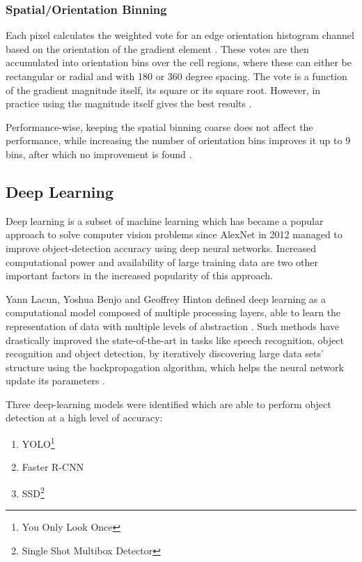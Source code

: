 \subsubsection{Spatial/Orientation Binning}

Each pixel calculates the weighted vote for an edge orientation histogram channel based on the orientation of the gradient element \cite{paper:dalal2005histograms}. These votes are then accumulated into orientation bins over the cell regions, where these can either be rectangular or radial and with 180\textdegree{} or 360\textdegree{} degree spacing. The vote is a function of the gradient magnitude itself, its square or its square root. However, in practice using the magnitude itself gives the best results \cite{paper:dalal2005histograms}.

Performance-wise, keeping the spatial binning coarse does not affect the performance, while increasing the number of orientation bins improves it up to 9 bins, after which no improvement is found \cite{paper:dalal2005histograms}.

\subsection{Deep Learning}

Deep learning is a subset of machine learning which has became a popular approach to solve computer vision problems since AlexNet in 2012 managed to improve object-detection accuracy using deep neural networks. Increased computational power and availability of large training data are two other important factors in the increased popularity of this approach.

Yann Lacun, Yoshua Benjo and Geoffrey Hinton defined deep learning as a computational model composed of multiple processing layers, able to learn the representation of data with multiple levels of abstraction \cite{paper:lecun2015deep}. Such methods have drastically improved the state-of-the-art in tasks like speech recognition, object recognition and object detection, by iteratively discovering large data sets' structure using the backpropagation algorithm, which helps the neural network update its parameters \cite{paper:lecun2015deep}.

Three deep-learning models were identified which are able to perform object detection at a high level of accuracy:

\begin{enumerate}
  \item YOLO\footnote{You Only Look Once} \cite{paper:YOLO}
  \item Faster R-CNN \cite{paper:FRCNN}
  \item SSD\footnote{Single Shot Multibox Detector} \cite{paper:SSD}
\end{enumerate}


